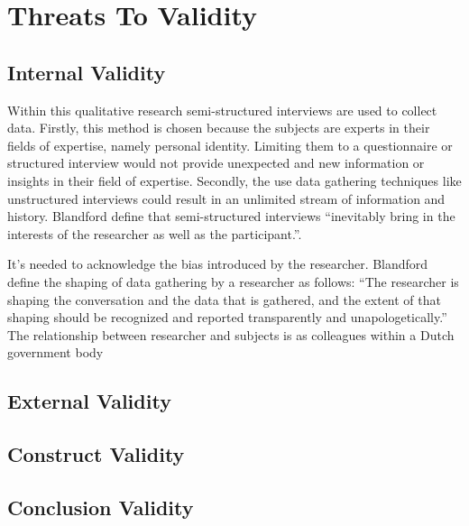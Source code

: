 \chapter{Threats To Validity}\label{sec:threats}


\section{Internal Validity}
Within this qualitative research semi-structured interviews are used to collect data. Firstly, this method is chosen because the subjects are experts in their fields of expertise, namely personal identity. Limiting them to a questionnaire or structured interview would not provide unexpected and new information or insights in their field of expertise. Secondly, the use data gathering techniques like unstructured interviews could result in an unlimited stream of information and history. Blandford \etal \cite{Blandford2016QualitativeHR} define that semi-structured interviews “inevitably bring in the interests of the researcher as well as the participant.”. 
\par
It’s needed to acknowledge the bias introduced by the researcher. Blandford \etal \cite{Blandford2016QualitativeHR} define the shaping of data gathering by a researcher as follows: “The researcher is shaping the conversation and the data that is gathered, and the extent of that shaping should be recognized and reported transparently and unapologetically.” The relationship between researcher and subjects is as colleagues within a Dutch government body
\section{External Validity}
\section{Construct Validity}
\section{Conclusion Validity}

